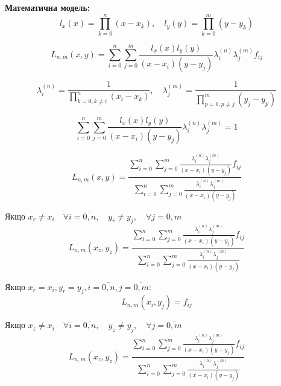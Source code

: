 \textbf{Математична модель:}
\begin{equation}
	l_x(x) = \prod_{k=0}^{n}(x-x_k), \quad l_y(y) = \prod_{k=0}^{m}(y-y_k) \tag{1}
\end{equation}

\begin{equation}
	L_{n,m}(x,y) = \sum_{i=0}^{n} \sum_{j=0}^{m} \frac{l_x(x)l_y(y)}{(x-x_i)(y-y_j)} \lambda_i^{(n)} \lambda_j^{(m)} f_{ij} \tag{2}
\end{equation}

\begin{equation}
	\lambda_i^{(n)} = \frac{1}{\prod_{k=0, k \ne i}^{n}(x_i-x_k)}, \quad \lambda_j^{(m)} = \frac{1}{\prod_{p=0, p \ne j}^{m}(y_j-y_p)} \tag{3}
\end{equation}

\begin{equation}
	\sum_{i=0}^{n} \sum_{j=0}^{m} \frac{l_x(x)l_y(y)}{(x-x_i)(y-y_j)} \lambda_i^{(n)} \lambda_j^{(m)} = 1 \tag{4}
\end{equation}

\begin{equation}
	L_{n,m}(x,y) = \frac{\sum_{i=0}^{n} \sum_{j=0}^{m} \frac{\lambda_i^{(n)} \lambda_j^{(m)}}{(x-x_i)(y-y_j)} f_{ij}}{\sum_{i=0}^{n} \sum_{j=0}^{m} \frac{\lambda_i^{(n)} \lambda_j^{(m)}}{(x-x_i)(y-y_j)}} \tag{5}
\end{equation}

Якщо $x_r \neq x_i \quad \forall i=\overline{0,n}, \quad y_r \neq y_j, \quad \forall j=\overline{0,m}$
\begin{equation*}
	L_{n,m}(x_z, y_z) = \frac{\sum_{i=0}^{n} \sum_{j=0}^{m} \frac{\lambda_i^{(n)} \lambda_j^{(m)}}{(x-x_i)(y-y_j)} f_{ij}}{\sum_{i=0}^{n} \sum_{j=0}^{m} \frac{\lambda_i^{(n)} \lambda_j^{(m)}}{(x-x_i)(y-y_j)}} \tag{6}
\end{equation*}

Якщо $x_r = x_i, y_r = y_j, i = \overline{0,n}, j = \overline{0,m}$:
\begin{equation}
	L_{n,m}(x_i, y_j) = f_{ij} \tag{7}
\end{equation}

Якщо $x_z \neq x_i \quad \forall i=\overline{0,n}, \quad y_z \neq y_j, \quad \forall j=\overline{0,m}$
\begin{equation*}
	L_{n,m}(x_z, y_z) = \frac{\sum_{i=0}^{n} \sum_{j=0}^{m} \frac{\lambda_i^{(n)} \lambda_j^{(m)}}{(x-x_i)(y-y_j)} f_{ij}}{\sum_{i=0}^{n} \sum_{j=0}^{m} \frac{\lambda_i^{(n)} \lambda_j^{(m)}}{(x-x_i)(y-y_j)}}
\end{equation*}

